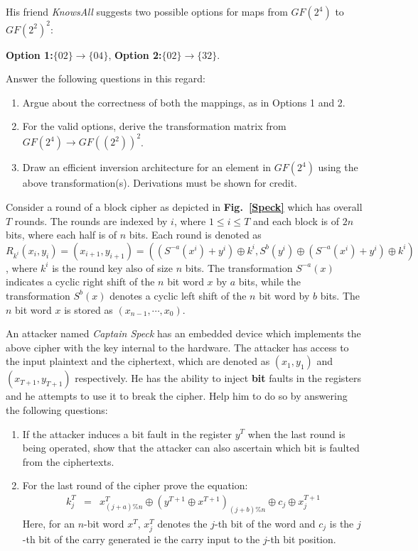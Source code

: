 \documentclass{article}
\begin{document}
\begin{questions}
His friend {\em KnowsAll} suggests two possible options for 
maps from $GF(2^4)$ to $GF(2^2)^2$:
 
{\bf Option 1:}$\{02\}\rightarrow \{04\}$, 
{\bf Option 2:}$\{02\}\rightarrow \{32\}$. 

Answer the following questions in this regard:
\begin{enumerate}
\item Argue about the correctness of both the mappings, as 
in Options 1 and 2. 
\item For the valid options, derive the transformation matrix 
from $GF(2^4)\rightarrow GF((2^2))^2$. 
\item Draw an efficient inversion architecture for an element 
in $GF(2^4)$ using the above transformation(s). Derivations must be shown for 
credit. 
\end{enumerate} 



\question 
Consider a round of a block cipher as depicted in {\bf Fig.~\ref{Speck}} which has overall $T$ rounds. 
The rounds are indexed by $i$, where $1 \leq i \leq T$ and each block is of $2n$ bits, where each half is of 
$n$ bits. Each round 
is denoted as $R_{k^i}(x_{i},y_{i})=(x_{i+1},y_{i+1})=((S^{-a}(x^i)+y^i)\oplus k^i,S^b(y^i)\oplus (S^{-a}(x^i)+y^i)\oplus k^i)$, 
where $k^i$ is the round key also of size $n$ bits. The transformation $S^{-a}(x)$ indicates a cyclic right shift 
of the $n$ bit word $x$ by $a$ bits, while the transformation $S^b(x)$ denotes a cyclic left shift 
of the $n$ bit word by $b$ bits. The $n$ bit word $x$ is stored as 
$(x_{n-1},\cdots,x_0)$. 


An attacker named {\em Captain Speck} has an embedded device which implements the above cipher with the key internal to the hardware. 
The attacker has access to the input plaintext and the ciphertext, which are denoted as $(x_1,y_1)$ and $(x_{T+1},y_{T+1})$ 
respectively. He has the ability to inject {\bf bit} faults in the registers and he attempts to use it to break 
the cipher. Help him to do so by answering the following questions:
\begin{enumerate}
\item If the attacker induces a bit fault in the register $y^T$ when 
the last round is being 
operated, show that the attacker can also ascertain which bit is faulted 
from the ciphertexts.

\item For the last round of the cipher prove the equation:
\begin{eqnarray*}
k_j^{T} &=& x_{(j+a)\%n}^T \oplus (y^{T+1} \oplus x^{T+1})_{(j+b)\%n}\oplus c_j \oplus x_j^{T+1}
\end{eqnarray*}
Here, for an $n$-bit word $x^T$, $x_j^T$ denotes the $j$-th bit of the word and $c_j$ is the 
$j$-th bit of the carry generated ie the carry input to the $j$-th bit position. 


\end{enumerate}
\end{questions}
\end{document}
